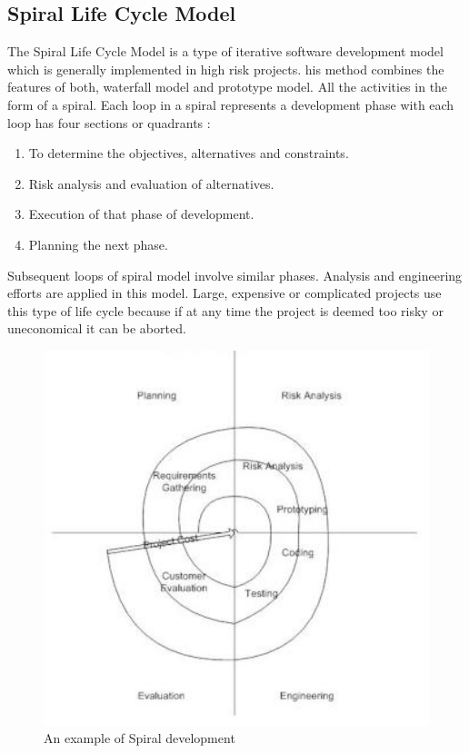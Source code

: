 \documentclass[a4paper, 12pt]{report}
\begin{document}
\subsection{Spiral Life Cycle Model}
The Spiral Life Cycle Model is a type of iterative software development model which is generally implemented in high risk projects. his method combines the features of both, waterfall model and prototype model. All the activities in the form of a spiral.
Each loop in a spiral represents a development phase with each loop has four sections or quadrants :
\begin{enumerate}
\item To determine the objectives, alternatives and constraints. 
\item Risk analysis and evaluation of alternatives. 
\item Execution of that phase of development. 
\item Planning the next phase. 
\end{enumerate}
Subsequent loops of spiral model involve similar phases. Analysis and engineering efforts are applied in this model. Large, expensive or complicated projects use this type of life cycle because if at any time the project is deemed too risky or uneconomical it can be aborted\cite{spiral}.
\begin{figure}[!htbp]
  \centering
    \includegraphics[width=1.0\textwidth]{Spiral-model.jpg}
    \caption{An example of Spiral development\cite{spiral}}
    \label{fig:spiral-dev}
\end{figure}\\
\end{document}
